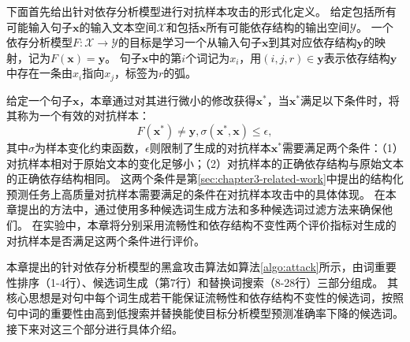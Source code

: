 下面首先给出针对依存分析模型进行对抗样本攻击的形式化定义。
给定包括所有可能输入句子$\bm{x}$的输入文本空间$\mathcal{X}$和包括$\bm{x}$所有可能依存结构的输出空间$\mathcal{Y}$。
一个依存分析模型$F: \mathcal{X} \rightarrow \mathcal{Y}$的目标是学习一个从输入句子$\bm{x}$到其对应依存结构$\bm{y}$的映射，记为$F(\bm{x}) = \bm{y}$。
句子$\bm{x}$中的第$i$个词记为$x_i$，用$(i,j,r) \in \bm{y}$表示依存结构$\bm{y}$中存在一条由$x_i$指向$x_j$，标签为$r$的弧。

给定一个句子$\bm{x}$，本章通过对其进行微小的修改获得$\bm{x}^*$，当$\bm{x}^*$满足以下条件时，将其称为一个有效的对抗样本：
$$F(\bm{x}^*) \neq \bm{y}, \sigma(\bm{x}^*, \bm{x})\le \epsilon, $$
其中$\sigma$为样本变化约束函数，$\epsilon$则限制了生成的对抗样本$\bm{x}^*$需要满足两个条件：（1）对抗样本相对于原始文本的变化足够小；（2）对抗样本的正确依存结构与原始文本的正确依存结构相同。
这两个条件是第\ref{sec:chapter3-related-work}中提出的结构化预测任务上高质量对抗样本需要满足的条件在对抗样本攻击中的具体体现。
在本章提出的方法中，通过使用多种候选词生成方法和多种候选词过滤方法来确保他们。
在实验中，本章将分别采用流畅性和依存结构不变性两个评价指标对生成的对抗样本是否满足这两个条件进行评价。

本章提出的针对依存分析模型的黑盒攻击算法如算法\ref{algo:attack}所示，由词重要性排序（1-4行）、候选词生成（第7行）和替换词搜索（8-28行）三部分组成。
其核心思想是对句中每个词生成若干能保证流畅性和依存结构不变性的候选词，按照句中词的重要性由高到低搜索并替换能使目标分析模型预测准确率下降的候选词。
接下来对这三个部分进行具体介绍。

